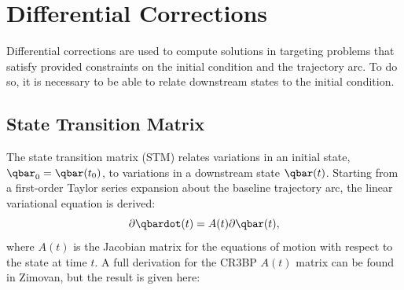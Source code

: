 \section{Differential Corrections}
Differential corrections are used to compute solutions in targeting problems that satisfy provided
constraints on the initial condition and the trajectory arc. To do so, it is necessary to be able
to relate downstream states to the initial condition.

\subsection{State Transition Matrix}
The state transition matrix (STM) relates variations in an initial state, $\qbar_{0}=\qbar(t_{0})$,
to variations in a downstream state $\qbar(t)$. Starting from a first-order Taylor series expansion
about the baseline trajectory arc, the linear variational equation is derived:
\begin{equation}
    \partial\qbardot(t)=A(t)\partial\qbar(t),
    \label{eq:linearvariational}
\end{equation}
where $A(t)$ is the Jacobian matrix for the equations of motion with respect to the state at time
$t$. A full derivation for the CR3BP $A(t)$ matrix can be found in Zimovan, but the result is given
here\cite{Zimovan:2017}:
